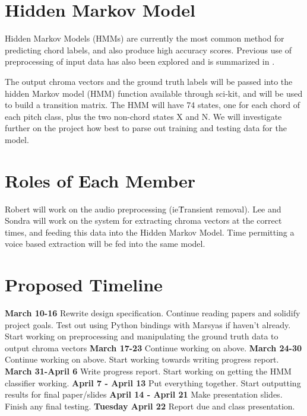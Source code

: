 \documentclass{article}
\begin{document}
\section{Hidden Markov Model}

Hidden Markov Models (HMMs) are currently the most common method for predicting
chord labels, and also produce high accuracy scores. Previous use of
preprocessing of input data has also been explored and is summarized in
\cite{McVicar:00}.

The output chroma vectors and the ground truth labels will be passed into the
hidden Markov model (HMM) function available through sci-kit, and will be used
to build a transition matrix. The HMM will have 74 states, one for each chord
of each pitch class, plus the two non-chord states X and N. We will investigate
further on the project how best to parse out training and testing data for the
model.

\section{Roles of Each Member}

Robert will work on the audio preprocessing (ie\. Transient removal).  Lee and
Sondra will work on the system for extracting chroma vectors at the correct
times, and feeding this data into the Hidden Markov Model. Time permitting a
voice based extraction will be fed into the same model.

\section{Proposed Timeline}\label{sec:timeline}

{\bf March 10-16}\newline
Rewrite design specification. Continue reading papers and solidify project
goals. Test out using Python bindings with Marsyas if haven't already. Start
working on preprocessing and manipulating the ground truth data to output
chroma vectors
\newline
{\bf March 17-23}\newline
Continue working on above.
\newline
{\bf March 24-30}\newline
Continue working on above. Start working towards writing progress report.
\newline
{\bf March 31-April 6}\newline
Write progress report. Start working on getting the HMM classifier working.
\newline
{\bf April 7 - April 13}\newline
Put everything together. Start outputting results for final paper/slides
\newline
{\bf April 14 - April 21}\newline
Make presentation slides. Finish any final testing.
\newline
{\bf Tuesday April 22}\newline
Report due and class presentation.
\end{document}
